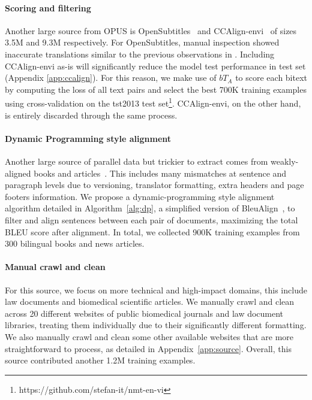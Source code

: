 \documentclass[11pt]{article}
\begin{document}
\paragraph{Scoring and filtering} Another large source from OPUS is OpenSubtitles~\cite{dataset_opensub} and CCAlign-envi~\cite{elkishky_ccaligned_2020} of sizes 3.5M and 9.3M respectively. For OpenSubtitles, manual inspection showed inaccurate translations similar to the previous observations in \citet{phomt}. Including CCAlign-envi as-is will significantly reduce the model test performance in test set (Appendix \ref{app:ccalign}). For this reason, we make use of $bT_A$ to score each bitext by  computing the loss of all text pairs and select the best 700K training examples using cross-validation on the tst2013 test set\footnote{https://github.com/stefan-it/nmt-en-vi}. CCAlign-envi, on the other hand, is entirely discarded through the same process. 



\paragraph{Dynamic Programming style alignment} Another large source of parallel data but trickier to extract comes from weakly-aligned books and articles~\cite{ladhak2020wikilingua}. This includes many mismatches at sentence and paragraph levels due to versioning, translator formatting, extra headers and page footers information. We propose a dynamic-programming style alignment algorithm detailed in Algorithm~\ref{alg:dp}, a simplified version of BleuAlign~\citep{bleualign}, to filter and align sentences between each pair of documents, maximizing the total BLEU score after alignment. 
In total, we collected 900K training examples from 300 bilingual books and news articles.

\paragraph{Manual crawl and clean} For this source, we focus on more technical and high-impact domains, this include law documents and biomedical scientific articles. We manually crawl and clean across 20 different websites of public biomedical journals and law document libraries, treating them individually due to their significantly different formatting. 
We also manually crawl and clean some other available websites that are more straightforward to process, as detailed in Appendix~\ref{app:source}. Overall, this source contributed another 1.2M training examples. 
\end{document}
